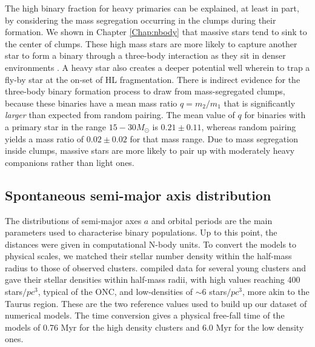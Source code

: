 The high binary fraction for heavy primaries can be explained, at least in part,  by considering the mass segregation occurring in the clumps during their formation. We shown in Chapter \ref{Chap:nbody} that massive stars tend to sink to the center of clumps. These high mass stars are more likely to capture another star to form a binary through a three-body interaction as they sit in denser environments \citep{Spitzer1987}. A heavy star also creates a deeper potential well wherein to trap a fly-by star at the on-set of HL fragmentation. There is indirect evidence for the three-body binary formation process to draw from mass-segregated clumps, because these binaries have a mean mass ratio $q = m_2/m_1$  that is significantly \textit{larger} than expected from random pairing. The mean value of $q$ for  binaries with a primary star in the range $15-30 M_\odot$  is $0.21 \pm 0.11$, whereas random pairing  yields a mass ratio of $0.02 \pm 0.02$ for that mass range. Due to mass segregation inside clumps, massive stars are more likely to pair up with moderately heavy companions rather than light ones.



\subsection{Spontaneous semi-major axis distribution}
\label{Sub:spontaneous_separations}

The distributions of semi-major axes $a$ and orbital  periods are the main parameters used to 
characterise binary populations. Up to this point, the distances were given in  computational N-body units. To convert the models to physical scales, we matched their stellar number density within the half-mass radius to those of observed clusters.  \cite{King2012a}  compiled  data for several young clusters and gave their stellar densities within half-mass radii, with high values reaching  400 stars$/pc^3$, typical of the ONC, and low-densities  of $\sim 6$ stars$/pc^3$, more akin to the Taurus region. These are the two reference values used to build up our dataset of numerical models. The time conversion gives a physical free-fall time of the models of 0.76 Myr for the high density clusters and 6.0 Myr for the low density ones.



